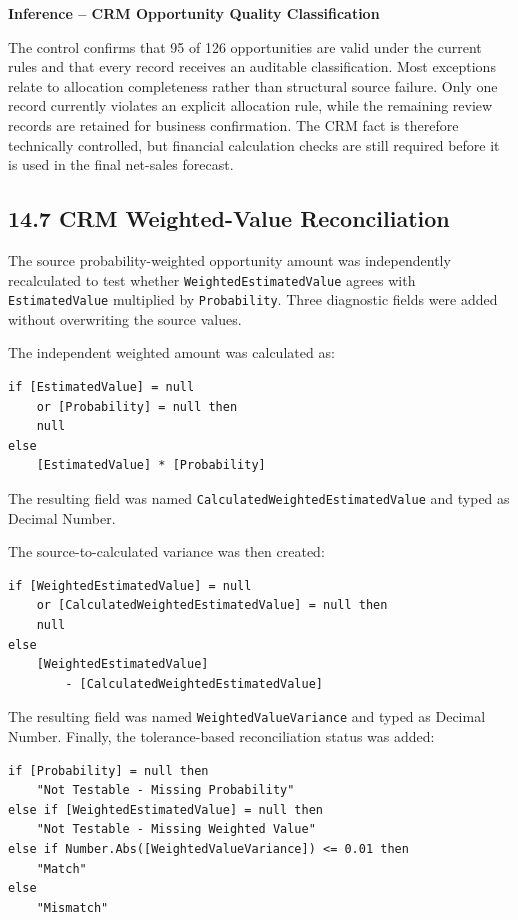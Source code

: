 \documentclass[11pt,a4paper]{article}
\begin{document}
\begin{inferencebox}

\textbf{Inference -- CRM Opportunity Quality Classification}

The control confirms that 95 of 126 opportunities are valid under the current
rules and that every record receives an auditable classification. Most
exceptions relate to allocation completeness rather than structural source
failure. Only one record currently violates an explicit allocation rule, while
the remaining review records are retained for business confirmation. The CRM
fact is therefore technically controlled, but financial calculation checks are
still required before it is used in the final net-sales forecast.

\end{inferencebox}

\subsection{14.7 CRM Weighted-Value Reconciliation}

The source probability-weighted opportunity amount was independently
recalculated to test whether \texttt{WeightedEstimatedValue} agrees with
\texttt{EstimatedValue} multiplied by \texttt{Probability}. Three diagnostic
fields were added without overwriting the source values.

The independent weighted amount was calculated as:

\begin{lstlisting}[style=powerquery]
if [EstimatedValue] = null
    or [Probability] = null then
    null
else
    [EstimatedValue] * [Probability]
\end{lstlisting}

The resulting field was named
\texttt{CalculatedWeightedEstimatedValue} and typed as Decimal Number.

The source-to-calculated variance was then created:

\begin{lstlisting}[style=powerquery]
if [WeightedEstimatedValue] = null
    or [CalculatedWeightedEstimatedValue] = null then
    null
else
    [WeightedEstimatedValue]
        - [CalculatedWeightedEstimatedValue]
\end{lstlisting}

The resulting field was named \texttt{WeightedValueVariance} and typed as
Decimal Number. Finally, the tolerance-based reconciliation status was added:

\begin{lstlisting}[style=powerquery]
if [Probability] = null then
    "Not Testable - Missing Probability"
else if [WeightedEstimatedValue] = null then
    "Not Testable - Missing Weighted Value"
else if Number.Abs([WeightedValueVariance]) <= 0.01 then
    "Match"
else
    "Mismatch"
\end{lstlisting}
\end{document}
